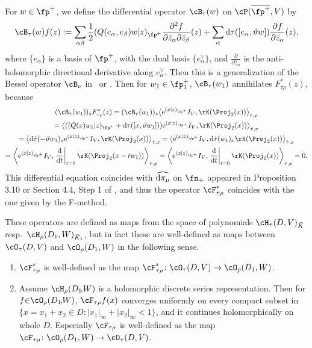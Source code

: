 \begin{Remark}
For $w\in\fp^+$, we define the differential operator $\cB_\tau(w)$ on $\cP(\overline{\fp^+},V)$ by
\begin{gather*} \cB_\tau(w)f(z):=\sum_{\alpha\beta}\frac{1}{2}(Q(e_\alpha,e_\beta)w|z)_{\fp^+}
\frac{\partial^2f}{\partial\bar{z}_\alpha\partial\bar{z}_\beta}(z)
+\sum_{\alpha}{\rm d}\tau([e_\alpha,\vartheta w])\frac{\partial f}{\partial \bar{z}_\alpha}(z), \end{gather*}
where $\{e_\alpha\}$ is a basis of $\fp^+$, with the dual basis $\{e_\alpha^\vee\}$,
and $\frac{\partial}{\partial\bar{z}_\alpha}$ is the anti-holomorphic directional derivative along $e_\alpha^\vee$.
Then this is a generalization of the Bessel operator $\cB_\nu$ in~\cite{D} or \cite[Section~XV.2]{FK}.
Then for $w_1\in\fp^+_1$, $\cB_\tau(w_1)$ annihilates $F_{\tau\rho}^*(z)$, because
\begin{gather*}
 (\cB_\tau(w_1))_zF_{\tau\rho}^*(z)
=(\cB_\tau(w_1))_z\big\langle {\rm e}^{(x|z)_{\fp^+}}I_V,\rK(\Proj_2(x))\big\rangle_{\hat{\tau},x} \\
 =\big\langle ((Q(x)w_1|z)_{\fp^+}+{\rm d}\tau([x,\vartheta w_1])){\rm e}^{(x|z)_{\fp^+}}I_V,\rK(\Proj_2(x))\big\rangle_{\hat{\tau},x} \\
 =\big\langle {\rm d}\hat{\tau}(-\vartheta w_1)_x{\rm e}^{(x|z)_{\fp^+}}I_V,\rK(\Proj_2(x))\big\rangle_{\hat{\tau},x}
=\big\langle {\rm e}^{(x|z)_{\fp^+}}I_V,{\rm d}\hat{\tau}(w_1)_x\rK(\Proj_2(x))\big\rangle_{\hat{\tau},x} \\
 =\left\langle {\rm e}^{(x|z)_{\fp^+}}I_V,\left.\frac{{\rm d}}{{\rm d}t}\right|_{t=0}\rK(\Proj_2(x-tw_1))\right\rangle_{\hat{\tau},x}
=\left\langle {\rm e}^{(x|z)_{\fp^+}}I_V,\left.\frac{{\rm d}}{{\rm d}t}\right|_{t=0}\rK(\Proj_2(x))\right\rangle_{\hat{\tau},x}=0.
\end{gather*}
This differential equation coincides with $\widehat{{\rm d}\pi_\mu}$ on $\fn_+$ appeared in Proposition 3.10 or Section 4.4, Step 1
of \cite{KP1}, and thus the operator $\cF_{\tau\rho}^*$ coincides with the one given by the F-method.
\end{Remark}
These operators are defined as maps from the space of polynomials $\cH_\tau(D,V)_{\tilde{K}}$ resp.\ \linebreak $\cH_\rho(D_1,W)_{\tilde{K}_1}$,
but in fact these are well-defined as maps between
$\cO_\tau(D,V)$ and $\cO_\rho(D_1,W)$ in the following sense.
\begin{Theorem}\label{extend}\quad
\begin{enumerate}\itemsep=0pt
\item[$(1)$] $\cF_{\tau\rho}^*$ is well-defined as the map $\cF_{\tau\rho}^*\colon \cO_\tau(D,V)\to\cO_\rho(D_1,W)$.
\item[$(2)$] Assume $\cH_\rho(D_1\!{,}W)$ is a holomorphic discrete series representation. Then for  $f{\in} \cO_\rho(D_1\!{,}W)$,
$\cF_{\tau\rho}f(x)$ converges uniformly on every compact subset in $\{x=x_1+x_2\in D\colon |x_1|_\infty+|x_2|_\infty\allowbreak <1\}$,
and it continues holomorphically on whole $D$. Especially $\cF_{\tau\rho}$ is well-defined as the map
$\cF_{\tau\rho}\colon \cO_\rho(D_1,W)\to \cO_\tau(D,V)$.
\end{enumerate}
\end{Theorem}
